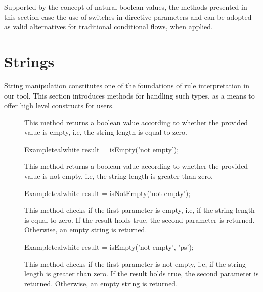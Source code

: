 Supported by the concept of natural boolean values, the methods presented in this section ease the use of switches in directive parameters and can be adopted as valid alternatives for traditional conditional flows, when applied.

\section{Strings}
\label{sec:strings}

String manipulation constitutes one of the foundations of rule interpretation in our tool. This section introduces methods for handling such types, as a means to offer high level constructs for users.

\begin{description}
\item[] This method returns a boolean value according to whether the provided  value is empty, i.e, the string length is equal to zero.

\begin{codebox}{Example}{teal}{\icnote}{white}
result = isEmpty('not empty');
\end{codebox}

\item[] This method returns a boolean value according to whether the provided  value is not empty, i.e, the string length is greater than zero.

\begin{codebox}{Example}{teal}{\icnote}{white}
result = isNotEmpty('not empty');
\end{codebox}

\item[] This method checks if the first parameter is empty, i.e, if the string length is equal to zero. If the result holds true, the second parameter is returned. Otherwise, an empty string is returned.

\begin{codebox}{Example}{teal}{\icnote}{white}
result = isEmpty('not empty', 'ps');
\end{codebox}

\item[] This method checks if the first parameter is not empty, i.e, if the string length is greater than zero. If the result holds true, the second parameter is returned. Otherwise, an empty string is returned.


\end{description}
